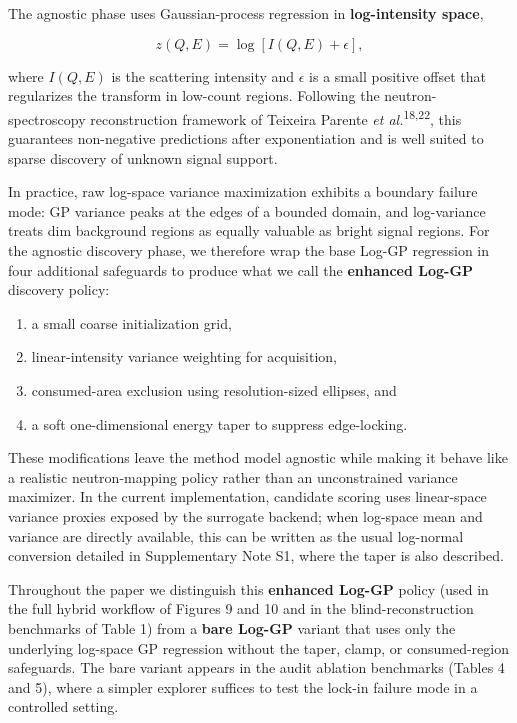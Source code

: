 \documentclass[
]{article}
\providecommand{\tightlist}{%
  \setlength{\itemsep}{0pt}\setlength{\parskip}{0pt}}
\begin{document}
The agnostic phase uses Gaussian-process regression in
\textbf{log-intensity space},

\[
z(Q,E)=\log[I(Q,E)+\epsilon],
\]

where \(I(Q,E)\) is the scattering intensity and \(\epsilon\) is a small
positive offset that regularizes the transform in low-count regions.
Following the neutron-spectroscopy reconstruction framework of Teixeira
Parente \emph{et al.}\textsuperscript{18,22}, this guarantees
non-negative predictions after exponentiation and is well suited to
sparse discovery of unknown signal support.

In practice, raw log-space variance maximization exhibits a boundary
failure mode: GP variance peaks at the edges of a bounded domain, and
log-variance treats dim background regions as equally valuable as bright
signal regions. For the agnostic discovery phase, we therefore wrap the
base Log-GP regression in four additional safeguards to produce what we
call the \textbf{enhanced Log-GP} discovery policy:

\begin{enumerate}
\def\labelenumi{\arabic{enumi}.}
\tightlist
\item
  a small coarse initialization grid,
\item
  linear-intensity variance weighting for acquisition,
\item
  consumed-area exclusion using resolution-sized ellipses, and
\item
  a soft one-dimensional energy taper to suppress edge-locking.
\end{enumerate}

These modifications leave the method model agnostic while making it
behave like a realistic neutron-mapping policy rather than an
unconstrained variance maximizer. In the current implementation,
candidate scoring uses linear-space variance proxies exposed by the
surrogate backend; when log-space mean and variance are directly
available, this can be written as the usual log-normal conversion
detailed in Supplementary Note S1, where the taper is also described.

Throughout the paper we distinguish this \textbf{enhanced Log-GP} policy
(used in the full hybrid workflow of Figures 9 and 10 and in the
blind-reconstruction benchmarks of Table 1) from a \textbf{bare Log-GP}
variant that uses only the underlying log-space GP regression without
the taper, clamp, or consumed-region safeguards. The bare variant
appears in the audit ablation benchmarks (Tables 4 and 5), where a
simpler explorer suffices to test the lock-in failure mode in a
controlled setting.
\end{document}

